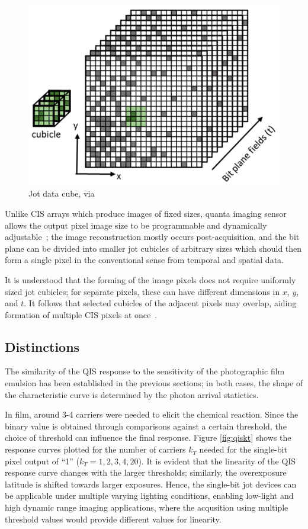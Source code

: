 \begin{figure}[h]
  \centering
  \includegraphics[width=0.7\linewidth]{imgs/qis/jotdatacube.png}
  \caption{Jot data cube, via \cite{fossum2016quanta}}
  \label{fig:jotcube}
\end{figure}

Unlike CIS arrays which produce images of fixed sizes, quanta imaging sensor allows the output pixel image size to be programmable and dynamically adjustable~\cite{FossumSiMulQIS}; the image reconstruction mostly occurs post-acquisition, and the bit plane can be divided into smaller jot cubicles of arbitrary sizes which should then form a single pixel in the conventional sense from temporal and spatial data.

It is understood that the forming of the image pixels does not require uniformly sized jot cubicles; for separate pixels, these can have different dimensions in $x$, $y$, and $t$. It follows that selected cubicles of the adjacent pixels may overlap, aiding formation of multiple CIS pixels at once~\cite{fossum2016quanta}.

\subsection{Distinctions}

The similarity of the QIS response to the sensitivity of the photographic film emulsion has been established in the previous sections; in both cases, the shape of the characteristic curve is determined by the photon arrival statictics. 

In film, around 3-4 carriers were needed to elicit the chemical reaction. Since the binary value is obtained through comparisons against a certain threshold, the choice of threshold can influence the final response. Figure \ref{fig:qiskt} shows the response curves plotted for the number of carriers $k_{T}$ needed for the single-bit pixel output of ``1'' ($k_{T}=1,2,3,4,20$). It is evident that the linearity of the QIS response curve changes with the larger thresholds; similarly, the overexposure latitude is shifted towards larger exposures. Hence, the single-bit jot devices can be applicable under multiple varying lighting conditions, enabling low-light and high dynamic range imaging applications, where the acqusition using multiple threshold values would provide different values for linearity.

